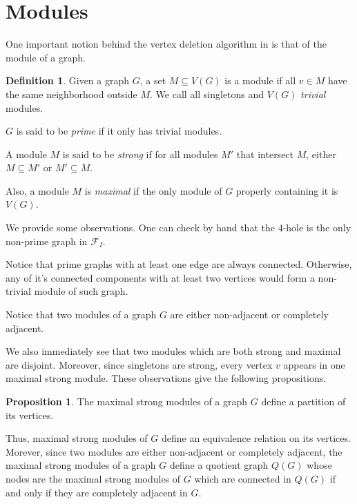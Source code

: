 \documentclass{article}
\theoremstyle{definition}
\newtheorem{prop}[thm]{Proposition}
\newtheorem{defn}[thm]{Definition}
\begin{document}
    \section{Modules}

    One important notion behind
    the vertex deletion algorithm in
    \cite{main} is that of
    the module of a graph. 

    \begin{defn}
        Given a graph $G$, a set $M \subseteq V\left(G\right)$
        is a module if all $v \in M$ have
        the same neighborhood outside $M$.
        We call all singletons and $V\left(G\right)$
        \emph{trivial} modules.
        
        $G$ is said to be
        \emph{prime} if
        it only has trivial modules.

        A module $M$ is said to 
        be \emph{strong} if for all modules
        $M'$ that intersect $M$,
        either $M \subseteq M'$ or
        $M' \subseteq M$.

        Also, a module $M$ is \emph{maximal} if 
        the only module of $G$ properly
        containing it is $V\left(G\right)$.
    \end{defn}
    
    We provide some observations.
    One can check by hand
    that the $4$-hole is the
    only non-prime
    graph in $\mathcal{F}_{I}$.

    Notice that prime graphs with 
    at least one edge are always
    connected. Otherwise, any
    of it's connected components
    with at least two vertices
    would form a non-trivial module
    of such graph.
    
    Notice that two modules of a graph
    $G$ are either non-adjacent 
    or completely adjacent.

    We also immediately see that two modules
    which are both strong and maximal
    are disjoint. Moreover, since
    singletons are strong, every vertex
    $v$ appears in one maximal strong
    module. These observations give
    the following propositions.

    \begin{prop}
        The maximal strong modules of
        a graph $G$ define a partition
        of its vertices.
    \end{prop}

    Thus, maximal strong modules
    of $G$ define an equivalence
    relation on its vertices.
    Morever, since two modules
    are either non-adjacent
    or completely adjacent, 
    the maximal strong modules
    of a graph $G$ define a
    quotient graph $Q\left(G\right)$ 
    whose nodes are the maximal 
    strong modules of $G$
    which are connected in $Q\left(G\right)$ 
    if and only if they are
    completely adjacent in $G$.
    
\end{document}
